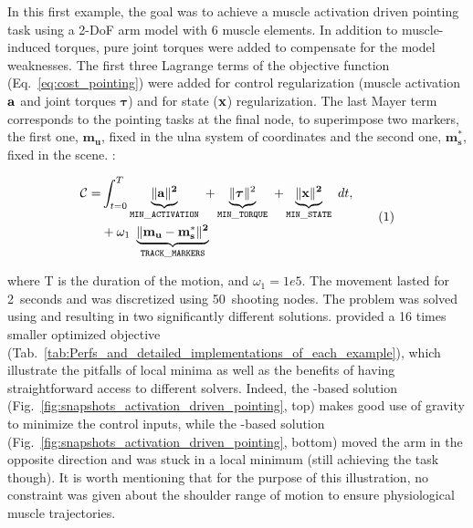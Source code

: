 In this first example, the goal was to achieve a muscle activation driven pointing task using a 2-DoF arm model with 6 muscle elements. 
In addition to muscle-induced torques, pure joint torques were added to compensate for the model weaknesses.
The first three Lagrange terms of the objective function (Eq.~\ref{eq:cost_pointing}) were added for control regularization (muscle activation $\bf{a}$ and joint torques $\boldsymbol{\tau}$) and for state ($\bf{x}$) regularization.
The last Mayer term corresponds to the pointing tasks at the final node, to superimpose two markers, the first one, $\mathbf{m_u}$, fixed in the ulna system of coordinates and the second one, $\mathbf{m^*_s}$, fixed in the scene.
:

\[
\begin{aligned}
	\mathcal{C} = &\int_{t=0}^T\underbrace{\|\bf{a}\|^2}_{\mathtt{MIN\_ACTIVATION}}~
	+\underbrace{\|\boldsymbol\tau\|^2}_{\mathtt{MIN\_TORQUE}}~
	+\underbrace{\|\bf{x}\|^2}_{\mathtt{MIN\_STATE}}~ dt,\\
	&+ \omega_1~\underbrace{\|\bf m_u-\bf m^*_s\|^2}_{\mathtt{TRACK\_MARKERS}}~
\end{aligned}
\addtag
\label{eq:cost_pointing}
\]
%

\noindent where T is the duration of the motion, and $\omega_1=1e5$.
The movement lasted for 2~seconds and was discretized using 50~shooting nodes.
The problem was solved using \ipopt and \acados resulting in two significantly different solutions.
\acados provided a 16 times smaller optimized objective (Tab.~\ref{tab:Perfs_and_detailed_implementations_of_each_example}), which illustrate the pitfalls of local minima as well as the benefits of having straightforward access to different solvers.  
Indeed, the \acados-based solution (Fig.~\ref{fig:snapshots_activation_driven_pointing}, top) makes good use of gravity to minimize the control inputs, while the \ipopt-based solution (Fig.~\ref{fig:snapshots_activation_driven_pointing}, bottom) moved the arm in the opposite direction and was stuck in a local minimum (still achieving the task though). 
It is worth mentioning that for the purpose of this illustration, no constraint was given about the shoulder range of motion to ensure physiological muscle trajectories. 

